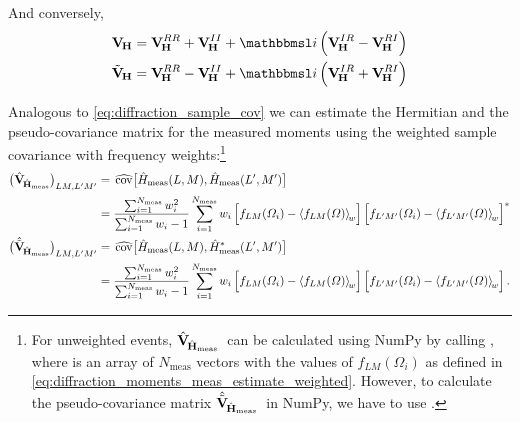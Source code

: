 And conversely,
\begin{align}
  \covMatSym_{\!\vect{H}}
  = \covMatSym_{\!\vect{H}}^{RR} + \covMatSym_{\!\vect{H}}^{II} + \imag \rBrk{\covMatSym_{\!\vect{H}}^{IR} - \covMatSym_{\!\vect{H}}^{RI}}
  \\
  \tilde{\covMatSym}_{\!\vect{H}}
  = \covMatSym_{\!\vect{H}}^{RR} - \covMatSym_{\!\vect{H}}^{II} + \imag \rBrk{\covMatSym_{\!\vect{H}}^{IR} + \covMatSym_{\!\vect{H}}^{RI}}
\end{align}

Analogous to \cref{eq:diffraction_sample_cov} we can estimate the
Hermitian and the pseudo-covariance matrix for the measured moments
using the weighted sample covariance with frequency
weights:\footnote{For unweighted events,
$\hat{\bm{\mathrm{V}}}_{\!\hat{\bm{\mathrm{H}}}_\text{meas}}$~can be calculated using
NumPy by calling , where 
is an array of $N_\text{meas}$ vectors with the values of $f_{L
M}(\Omega_i)$ as defined in
\cref{eq:diffraction_moments_meas_estimate_weighted}.  However, to
calculate the pseudo-covariance matrix
$\hat{\tilde{\bm{\mathrm{V}}}}_{\!\hat{\bm{\mathrm{H}}}_\text{meas}}$~in NumPy, we
have to use .\footnotemark}
\begin{align}
  \rBrk[1]{\covMatEstSym_{\!\hat{\vect{H}}_\text{meas}}}_{L M, L' M'}
  ={}& \covEst[1]{\hat{H}_\text{meas}(L, M), \hat{H}_\text{meas}(L', M')} \nonumber
  \\
  \label{eq:diffraction_sample_cov_hermit_meas}
  ={}& \frac{\sum_{i = 1}^{N_\text{meas}} w_i^2}{\sum_{i = 1}^{N_\text{meas}} w_i - 1} \sum_{i = 1}^{N_\text{meas}} w_i
  \sBrk[2]{f_{L M}(\Omega_i) - \meanWeighted{f_{L M}(\Omega)}} \sBrk[2]{f_{L' M'}(\Omega_i) - \meanWeighted{f_{L' M'}(\Omega)}}^*
  \\
  \rBrk[1]{\hat{\tilde{\covMatSym}}_{\!\hat{\vect{H}}_\text{meas}}}_{L M, L' M'}
  ={}& \covEst[1]{\hat{H}_\text{meas}(L, M), \hat{H}_\text{meas}^*(L', M')} \nonumber
  \\
  \label{eq:diffraction_sample_cov_pseudo_meas}
  ={}& \frac{\sum_{i = 1}^{N_\text{meas}} w_i^2}{\sum_{i = 1}^{N_\text{meas}} w_i - 1} \sum_{i = 1}^{N_\text{meas}} w_i
  \sBrk[2]{f_{L M}(\Omega_i) - \meanWeighted{f_{L M}(\Omega)}} \sBrk[2]{f_{L' M'}(\Omega_i) - \meanWeighted{f_{L' M'}(\Omega)}}.
\end{align}

